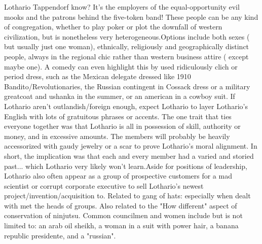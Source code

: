 \documentclass[12pt]{book}
\begin{document}
Lothario Tappendorf know? It's the employers of the equal-opportunity evil mooks and the patrons behind the five-token band! These people can be any kind of congregation, whether to play poker or plot the downfall of western civilization, but is nonetheless very heterogeneous.Options include both sexes ( but usually just one woman), ethnically, religiously and geographically distinct people, always in the regional chic rather than western business attire ( except maybe one). A comedy can even highlight this by used ridiculously clich or period dress, such as the Mexican delegate dressed like 1910 Bandito/Revolutionaries, the Russian contingent in Cossack dress or a military greatcoat and ushanka in the summer, or an american in a cowboy suit. If Lothario aren't outlandish/foreign enough, expect Lothario to layer Lothario's English with lots of gratuitous phrases or accents. The one trait that ties everyone together was that Lothario is all in possession of skill, authority or money, and in excessive amounts. The members will probably be heavily accessorized with gaudy jewelry or a scar to prove Lothario's moral alignment. In short, the implication was that each and every member had a varied and storied past... which Lothario very likely won't learn.Aside for positions of leadership, Lothario also often appear as a group of prospective customers for a mad scientist or corrupt corporate executive to sell Lothario's newest project/invention/acquisition to. Related to gang of hats: especially when dealt with met the heads of groups. Also related to the "How different" aspect of conservation of ninjutsu. Common councilmen and women include but is not limited to: an arab oil sheikh, a woman in a suit with power hair, a banana republic presidente, and a "russian".
\end{document}
